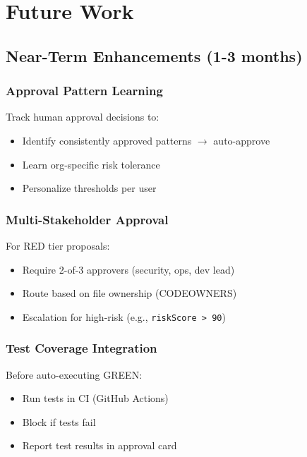 \documentclass[11pt,a4paper]{article}
\begin{document}
\newpage
\section{Future Work}

\subsection{Near-Term Enhancements (1-3 months)}

\subsubsection{Approval Pattern Learning}
Track human approval decisions to:
\begin{itemize}
    \item Identify consistently approved patterns $\rightarrow$ auto-approve
    \item Learn org-specific risk tolerance
    \item Personalize thresholds per user
\end{itemize}

\subsubsection{Multi-Stakeholder Approval}
For RED tier proposals:
\begin{itemize}
    \item Require 2-of-3 approvers (security, ops, dev lead)
    \item Route based on file ownership (CODEOWNERS)
    \item Escalation for high-risk (e.g., \texttt{riskScore > 90})
\end{itemize}

\subsubsection{Test Coverage Integration}
Before auto-executing GREEN:
\begin{itemize}
    \item Run tests in CI (GitHub Actions)
    \item Block if tests fail
    \item Report test results in approval card
\end{itemize}
\end{document}
